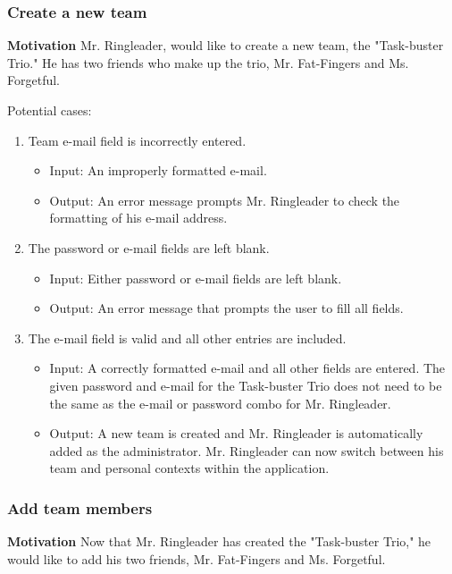 \subsubsection{Create a new team}
\textbf{Motivation} Mr. Ringleader, would like to create a new team, the
"Task-buster Trio." He has two friends who make up the trio, Mr. Fat-Fingers
and Ms. Forgetful.

Potential cases:
\begin{enumerate}
    \item Team e-mail field is incorrectly entered.
        \begin{itemize}
            \item Input: An improperly formatted e-mail.
            \item Output: An error message prompts Mr. Ringleader to check the
formatting of his e-mail address.
        \end{itemize}
    \item The password or e-mail fields are left blank.
        \begin{itemize}
            \item Input: Either password or e-mail fields are left blank.
            \item Output: An error message that prompts the user to fill all
fields.
        \end{itemize}
    \item The e-mail field is valid and all other entries are included.
        \begin{itemize}
            \item Input: A correctly formatted e-mail and all other fields are
entered. The given password and e-mail for the Task-buster Trio does not need
to be the same as the e-mail or password combo for Mr. Ringleader.
            \item Output: A new team is created and Mr. Ringleader is
automatically added as the administrator.
                Mr. Ringleader can now switch between his team and personal
contexts within the application.
        \end{itemize}
\end{enumerate}

\subsubsection{Add team members}
\textbf{Motivation} Now that Mr. Ringleader has created the "Task-buster
Trio," he would like to add his two friends, Mr. Fat-Fingers and Ms.
Forgetful.

